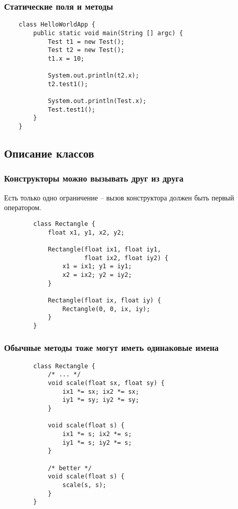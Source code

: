 \begin{frame}[fragile]
	\frametitle{Статические поля и методы}
	\begin{verbatim}
	class HelloWorldApp {
	    public static void main(String [] argc) {
	        Test t1 = new Test();
	        Test t2 = new Test();
	        t1.x = 10;

	        System.out.println(t2.x);
	        t2.test1();

	        System.out.println(Test.x);
	        Test.test1();
	    }
	}
	\end{verbatim}

\end{frame}

\subsection{Описание классов}
\begin{frame}[fragile]
	\frametitle{Конструкторы можно вызывать друг из друга}
	{\large Есть только одно ограничение -- вызов конструктора должен быть первый оператором.}

	\medskip
	\begin{verbatim}
		class Rectangle {
		    float x1, y1, x2, y2;

		    Rectangle(float ix1, float iy1,
		              float ix2, float iy2) {
		        x1 = ix1; y1 = iy1;
		        x2 = ix2; y2 = iy2;
		    }

		    Rectangle(float ix, float iy) {
		        Rectangle(0, 0, ix, iy);
		    }
		}
	\end{verbatim}

\end{frame}

\begin{frame}[fragile]
	\frametitle{Обычные методы тоже могут иметь одинаковые имена}

	\begin{large}
	\begin{verbatim}
		class Rectangle {
		    /* ... */
		    void scale(float sx, float sy) {
		        ix1 *= sx; ix2 *= sx;
		        iy1 *= sy; iy2 *= sy;
		    }

		    void scale(float s) {
		        ix1 *= s; ix2 *= s;
		        iy1 *= s; iy2 *= s;
		    }

		    /* better */
		    void scale(float s) {
		        scale(s, s);
		    }
		}
	\end{verbatim}
	\end{large}
\end{frame}


